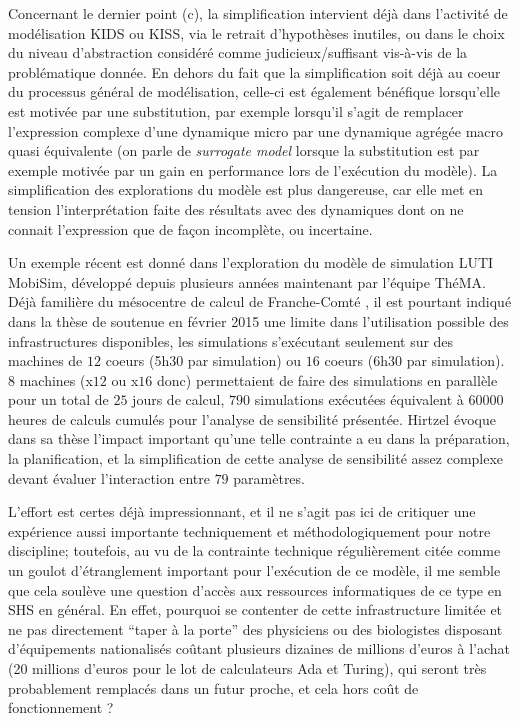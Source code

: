 Concernant le dernier point (c), la simplification intervient déjà dans l'activité de modélisation KIDS ou KISS, via le retrait d'hypothèses inutiles, ou dans le choix du niveau d'abstraction considéré comme judicieux/suffisant vis-à-vis de la problématique donnée. En dehors du fait que la simplification soit déjà au coeur du processus général de modélisation, celle-ci est également bénéfique lorsqu'elle est motivée par une substitution, par exemple lorsqu'il s'agit de remplacer l'expression complexe d'une dynamique micro par une dynamique agrégée macro quasi équivalente (on parle de \textit{surrogate model} lorsque la substitution est par exemple motivée par un gain en performance lors de l'exécution du modèle). La simplification des explorations du modèle est plus dangereuse, car elle met en tension l'interprétation faite des résultats avec des dynamiques dont on ne connait l'expression que de façon incomplète, ou incertaine.

Un exemple récent est donné dans l'exploration du modèle de simulation LUTI MobiSim, développé depuis plusieurs années maintenant par l'équipe ThéMA. Déjà familière du mésocentre de calcul de Franche-Comté \autocite{Asch2012}, il est pourtant indiqué dans la thèse de \textcite{Hirtzel2015} soutenue en février 2015 une limite dans l'utilisation possible des infrastructures disponibles, les simulations s'exécutant seulement sur des machines de $12$ coeurs (5h30 par simulation) ou $16$ coeurs (6h30 par simulation). $8$ machines (x$12$ ou x$16$ donc) permettaient de faire des simulations en parallèle pour un total de $25$ jours de calcul, $790$ simulations exécutées équivalent à $\num{60000}$ heures de calculs cumulés pour l'analyse de sensibilité présentée. Hirtzel évoque dans sa thèse l'impact important qu'une telle contrainte a eu dans la préparation, la planification, et la simplification de cette analyse de sensibilité assez complexe devant évaluer l'interaction entre $79$ paramètres.

L'effort est certes déjà impressionnant, et il ne s'agit pas ici de critiquer une expérience aussi importante techniquement et méthodologiquement pour notre discipline; toutefois, au vu de la contrainte technique régulièrement citée comme un goulot d'étranglement important pour l'exécution de ce modèle, il me semble que cela soulève une question d'accès aux ressources informatiques de ce type en SHS en général. En effet, pourquoi se contenter de cette infrastructure limitée et ne pas directement \enquote{taper à la porte} des physiciens ou des biologistes disposant d'équipements nationalisés coûtant plusieurs dizaines de millions d'euros à l'achat (20 millions d'euros pour le lot de calculateurs Ada et Turing), qui seront très probablement remplacés dans un futur proche, et cela hors coût de fonctionnement ?

